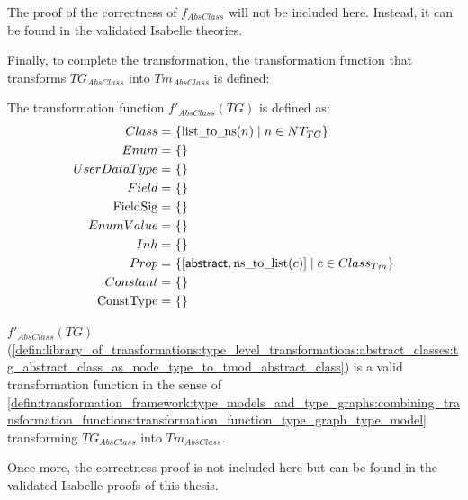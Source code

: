 The proof of the correctness of $f_{AbsClass}$ will not be included here. Instead, it can be found in the validated Isabelle theories.

Finally, to complete the transformation, the transformation function that transforms $TG_{AbsClass}$ into $Tm_{AbsClass}$ is defined:

\begin{defin}
\label{defin:library_of_transformations:type_level_transformations:abstract_classes:tg_abstract_class_as_node_type_to_tmod_abstract_class}
The transformation function $f'_{AbsClass}(TG)$ is defined as:
\begin{align*}
Class =\ &\{\mathrm{list\_\!to\_\!ns}(n) \mid n \in NT_{TG}\} \\
Enum =\ &\{\} \\
UserDataType =\ &\{\} \\
Field =\ &\{\} \\
\mathrm{FieldSig} =\ &\{\} \\
EnumValue =\ &\{\} \\
Inh =\ &\{\} \\
Prop =\ &\{[ \mathsf{abstract}, \mathrm{ns\_\!to\_\!list}(c) ] \mid c \in Class_{Tm}\} \\
Constant =\ &\{\} \\
\mathrm{ConstType} =\ &\{\}
\end{align*}
\end{defin}

\begin{thm}
\label{defin:library_of_transformations:type_level_transformations:abstract_classes:tg_abstract_class_as_node_type_to_tmod_abstract_class_func}
$f'_{AbsClass}(TG)$ (\cref{defin:library_of_transformations:type_level_transformations:abstract_classes:tg_abstract_class_as_node_type_to_tmod_abstract_class}) is a valid transformation function in the sense of \cref{defin:transformation_framework:type_models_and_type_graphs:combining_transformation_functions:transformation_function_type_graph_type_model} transforming $TG_{AbsClass}$ into $Tm_{AbsClass}$.
\end{thm}

Once more, the correctness proof is not included here but can be found in the validated Isabelle proofs of this thesis.
